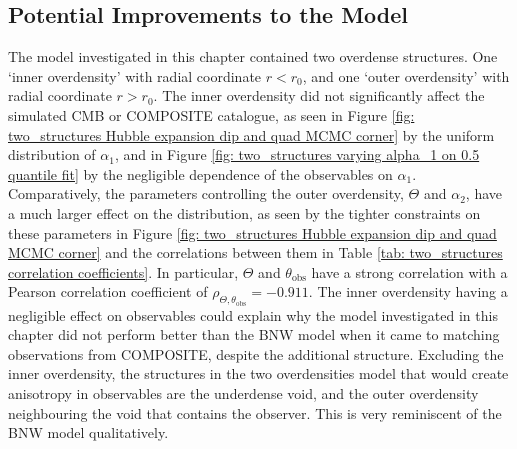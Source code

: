 \documentclass[a4paper,12pt]{report}
\begin{document}
\subsection{Potential Improvements to the Model}
The model investigated in this chapter contained two overdense structures. One `inner overdensity' with radial coordinate $r < r_0$, and one `outer overdensity' with radial coordinate $r > r_0$. The inner overdensity did not significantly affect the simulated CMB or COMPOSITE catalogue, as seen in Figure \ref{fig: two_structures Hubble expansion dip and quad MCMC corner} by the uniform distribution of $\alpha_1$, and in Figure \ref{fig: two_structures varying alpha_1 on 0.5 quantile fit} by the negligible dependence of the observables on $\alpha_1$. Comparatively, the parameters controlling the outer overdensity, $\Theta$ and $\alpha_2$, have a much larger effect on the distribution, as seen by the tighter constraints on these parameters in Figure \ref{fig: two_structures Hubble expansion dip and quad MCMC corner} and the correlations between them in Table \ref{tab: two_structures correlation coefficients}. In particular, $\Theta$ and $\theta_\text{obs}$ have a strong correlation with a Pearson correlation coefficient of $\rho_{\Theta, \theta_\text{obs}} = -0.911$. The inner overdensity having a negligible effect on observables could explain why the model investigated in this chapter did not perform better than the BNW model when it came to matching observations from COMPOSITE, despite the additional structure. Excluding the inner overdensity, the structures in the two overdensities model that would create anisotropy in observables are the underdense void, and the outer overdensity neighbouring the void that contains the observer. This is very reminiscent of the BNW model qualitatively.
\end{document}
